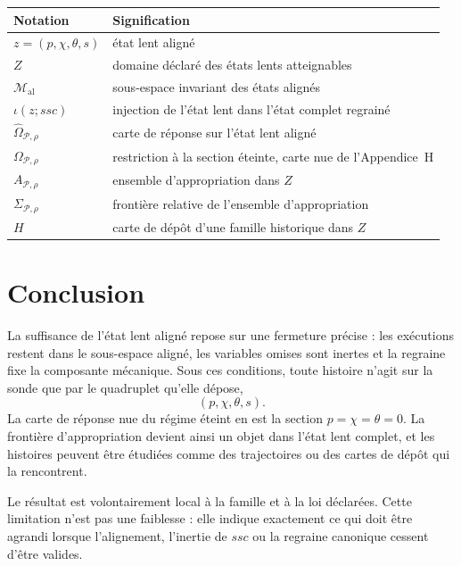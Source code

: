 \begin{center}
\begin{tabular}{p{}p{}}
\toprule
Notation & Signification \\
\midrule
$z=(p,\chi,\theta,s)$ & état lent aligné \\
$Z$ & domaine déclaré des états lents atteignables \\
$\mathcal M_{\mathrm{al}}$ & sous-espace invariant des états alignés \\
$\iota(z;ssc)$ & injection de l'état lent dans l'état complet regrainé \\
$\widehat\Omega_{\mathcal P,\rho}$ & carte de réponse sur l'état lent aligné \\
$\Omega_{\mathcal P,\rho}$ & restriction à la section éteinte, carte nue de l'Appendice~H \\
$A_{\mathcal P,\rho}$ & ensemble d'appropriation dans $Z$ \\
$\Sigma_{\mathcal P,\rho}$ & frontière relative de l'ensemble d'appropriation \\
$H$ & carte de dépôt d'une famille historique dans $Z$ \\
\bottomrule
\end{tabular}
\end{center}

\section{Conclusion}
\label{annexe-I-conclusion}

La suffisance de l'état lent aligné repose sur une fermeture précise :
les exécutions restent dans le sous-espace aligné, les variables omises
sont inertes et la regraine fixe la composante mécanique. Sous ces
conditions, toute histoire n'agit sur la sonde que par le quadruplet
qu'elle dépose,
\[
(p,\chi,\theta,s).
\]
La carte de réponse nue du régime éteint en est la section
$p=\chi=\theta=0$. La frontière d'appropriation devient ainsi un objet
dans l'état lent complet, et les histoires peuvent être étudiées comme
des trajectoires ou des cartes de dépôt qui la rencontrent.

Le résultat est volontairement local à la famille et à la loi déclarées.
Cette limitation n'est pas une faiblesse : elle indique exactement ce
qui doit être agrandi lorsque l'alignement, l'inertie de $ssc$ ou la
regraine canonique cessent d'être valides.
